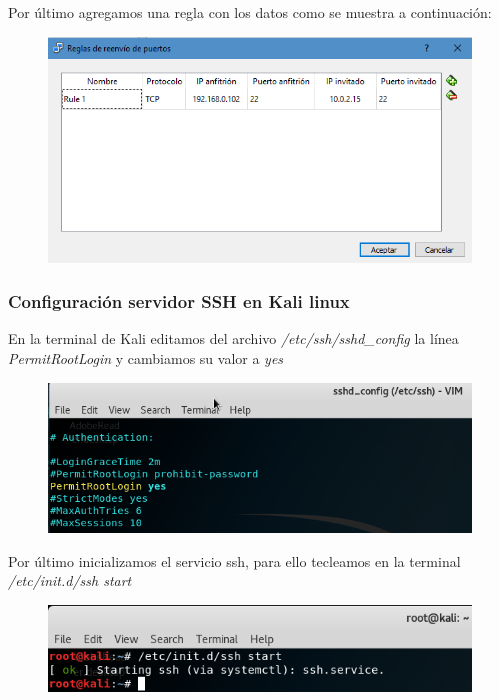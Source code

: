 \documentclass{article}
\begin{document}
Por \'ultimo agregamos una regla con los datos como se muestra a continuaci\'on: 

\begin{figure}[H]
\centering
\includegraphics[width=1\textwidth]{05-CONFIGURADO}
\end{figure}

\subsubsection{Configuraci\'on servidor SSH en Kali linux}

En la terminal de Kali editamos del archivo \emph{/etc/ssh/sshd\_config} la l\'inea \emph{PermitRootLogin} y cambiamos su valor a \emph{yes}

\begin{figure}[H]
\centering
\includegraphics[width=1\textwidth]{06-CONFIGURACIONSSHD}
\end{figure}

Por \'ultimo inicializamos el servicio ssh, para ello tecleamos en la terminal \emph{/etc/init.d/ssh start}

\begin{figure}[H]
\centering
\includegraphics[width=1\textwidth]{07-STARTSSHD}
\end{figure}
\end{document}
